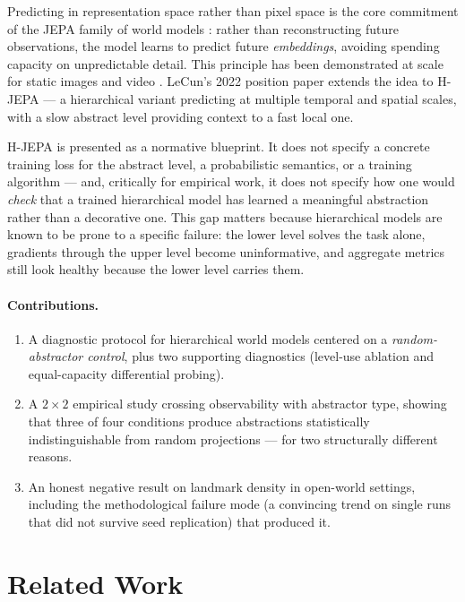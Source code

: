 \documentclass[11pt]{article}
\begin{document}
Predicting in representation space rather than pixel space is the core commitment of the JEPA family of world models \citep{lecun2022path}: rather than reconstructing future observations, the model learns to predict future \emph{embeddings}, avoiding spending capacity on unpredictable detail. This principle has been demonstrated at scale for static images \citep{assran2023ijepa} and video \citep{bardes2024vjepa}. LeCun's 2022 position paper extends the idea to H-JEPA --- a hierarchical variant predicting at multiple temporal and spatial scales, with a slow abstract level providing context to a fast local one.

H-JEPA is presented as a normative blueprint. It does not specify a concrete training loss for the abstract level, a probabilistic semantics, or a training algorithm --- and, critically for empirical work, it does not specify how one would \emph{check} that a trained hierarchical model has learned a meaningful abstraction rather than a decorative one. This gap matters because hierarchical models are known to be prone to a specific failure: the lower level solves the task alone, gradients through the upper level become uninformative, and aggregate metrics still look healthy because the lower level carries them.

\paragraph{Contributions.}
\begin{enumerate}
\item A diagnostic protocol for hierarchical world models centered on a \emph{random-abstractor control}, plus two supporting diagnostics (level-use ablation and equal-capacity differential probing).
\item A $2\times2$ empirical study crossing observability with abstractor type, showing that three of four conditions produce abstractions statistically indistinguishable from random projections --- for two structurally different reasons.
\item An honest negative result on landmark density in open-world settings, including the methodological failure mode (a convincing trend on single runs that did not survive seed replication) that produced it.
\end{enumerate}

\section{Related Work}
\end{document}

